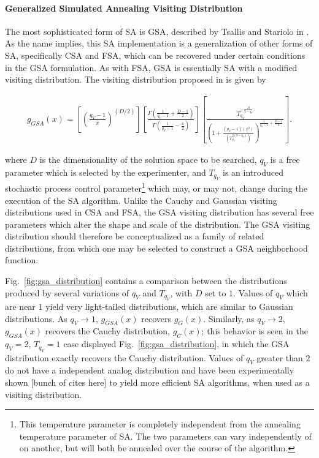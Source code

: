 \documentclass[11pt]{afthesis}
\begin{document}
	  
	
	 

	

	\paragraph{Generalized Simulated Annealing Visiting Distribution}
	
	The most sophisticated form of SA is GSA, described by Tsallis and Stariolo in \cite{tsallis1996generalizedsimulatedannealing}. As the name implies, this SA implementation is a generalization of other forms of SA, specifically CSA and FSA, which can be recovered under certain conditions in the GSA formulation. As with FSA, GSA is essentially SA with a modified visiting distribution. The visiting distribution proposed in \cite{tsallis1996generalizedsimulatedannealing} is given by 
	
	\begin{align}\label{eq:gsa_visiting_distribution}
		g_{GSA}(x) = \left[ \left(\frac{q_V-1}{\pi}\right)^{(D/2)} \right]
		\left[ \frac{\Gamma \left( \frac{1}{q_V-1}+\frac{D-1}{2} \right) }{\Gamma \left( \frac{1}{q_V-1}-\frac{1}{2} \right)} \right]
		\left[ \frac{T_{q_V}^{-\frac{D}{3-q_V}}}{\left( 1+\frac{(q_V-1)(x^2)}{\left(T_{q_V}^{2(3-q_V)}\right)}\right)^{\frac{1}{q_V-1}+\frac{D-1}{2}} } \right].
	\end{align}
	
	\noindent where $D$ is the dimensionality of the solution space to be searched, $q_V$ is a free parameter which is selected by the experimenter, and $T_{q_V}$ is an introduced stochastic process control parameter\footnote{This temperature parameter is completely independent from the annealing temperature parameter of SA. The two parameters can vary independently of on another, but will both be annealed over the course of the algorithm.} which may, or may not, change during the execution of the SA algorithm. Unlike the Cauchy and Gaussian visiting distributions used in CSA and FSA, the GSA visiting distribution has several free parameters which alter the shape and scale of the distribution. The GSA visiting distribution should therefore be conceptualized as a family of related distributions, from which one may be selected to construct a GSA neighborhood function. 
	
	Fig.~\ref{fig:gsa_distribution} contains a comparison between the distributions produced by several variations of $q_V$ and $T_{q_V}$, with $D$ set to $1$. Values of $q_V$ which are near $1$ yield very light-tailed distributions, which are similar to Gaussian distributions. As $q_V \rightarrow 1$, $g_{GSA}(x)$ recovers $g_{G}(x)$. Similarly, as $q_V \rightarrow 2$, $g_{GSA}(x)$ recovers the Cauchy distribution, $g_{C}(x)$; this behavior is seen in the $q_V=2$, $T_{q_V}=1$ case displayed Fig.~\ref{fig:gsa_distribution}, in which the GSA distribution exactly recovers the Cauchy distribution. Values of $q_V$ greater than $2$ do not have a independent analog distribution and have been experimentally shown [bunch of cites here] to yield more efficient SA algorithms, when used as a visiting distribution. 	
	
\end{document}
